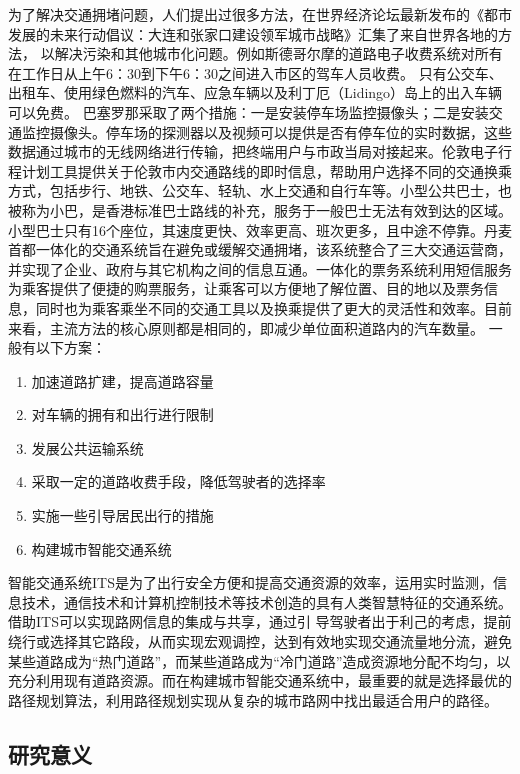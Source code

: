 为了解决交通拥堵问题，人们提出过很多方法，在世界经济论坛最新发布的《都市发展的未来行动倡议：大连和张家口建设领军城市战略》汇集了来自世界各地的方法，
以解决污染和其他城市化问题。例如斯德哥尔摩的道路电子收费系统对所有在工作日从上午6：30到下午6：30之间进入市区的驾车人员收费。
只有公交车、出租车、使用绿色燃料的汽车、应急车辆以及利丁厄（Lidingo）岛上的出入车辆可以免费。
巴塞罗那采取了两个措施：一是安装停车场监控摄像头；二是安装交通监控摄像头。停车场的探测器以及视频可以提供是否有停车位的实时数据，这些数据通过城市的无线网络进行传输，把终端用户与市政当局对接起来。伦敦电子行程计划工具提供关于伦敦市内交通路线的即时信息，帮助用户选择不同的交通换乘方式，包括步行、地铁、公交车、轻轨、水上交通和自行车等。小型公共巴士，也被称为小巴，是香港标准巴士路线的补充，服务于一般巴士无法有效到达的区域。小型巴士只有16个座位，其速度更快、效率更高、班次更多，且中途不停靠。丹麦首都一体化的交通系统旨在避免或缓解交通拥堵，该系统整合了三大交通运营商，并实现了企业、政府与其它机构之间的信息互通。一体化的票务系统利用短信服务为乘客提供了便捷的购票服务，让乘客可以方便地了解位置、目的地以及票务信息，同时也为乘客乘坐不同的交通工具以及换乘提供了更大的灵活性和效率。目前来看，主流方法的核心原则都是相同的，即减少单位面积道路内的汽车数量。
一般有以下方案：
\begin{enumerate}%
    \item 加速道路扩建，提高道路容量
    \item 对车辆的拥有和出行进行限制
    \item 发展公共运输系统
    \item 采取一定的道路收费手段，降低驾驶者的选择率
    \item 实施一些引导居民出行的措施
    \item 构建城市智能交通系统
\end{enumerate}

智能交通系统ITS是为了出行安全方便和提高交通资源的效率，运用实时监测，信息技术，通信技术和计算机控制技术等技术创造的具有人类智慧特征的交通系统。借助ITS可以实现路网信息的集成与共享，通过引 导驾驶者出于利己的考虑，提前绕行或选择其它路段，从而实现宏观调控，达到有效地实现交通流量地分流，避免某些道路成为“热门道路”，而某些道路成为“冷门道路”造成资源地分配不均匀，以充分利用现有道路资源。而在构建城市智能交通系统中，最重要的就是选择最优的路径规划算法，利用路径规划实现从复杂的城市路网中找出最适合用户的路径。

\subsection{研究意义}\label{subsec:研究意义}

